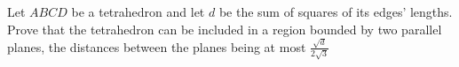 Let $ABCD$ be a tetrahedron and let $d$ be the sum of squares of its edges' lengths. Prove that the tetrahedron can be included in a region bounded by two parallel planes, the distances between the planes being at most $\frac{\sqrt{d}}{2\sqrt{3}}$